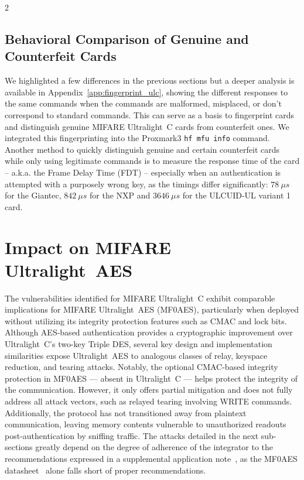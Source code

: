 \documentclass[10pt,letterpaper]{article}
\begin{document}
\begin{multicols}{2}
\subsection{Behavioral Comparison of Genuine and Counterfeit Cards}
\label{sec:fingerprint_ulc}
We highlighted a few differences in the previous sections but a deeper analysis is available in Appendix~\ref{app:fingerprint_ulc}, showing the different responses to the same commands when the commands are malformed, misplaced, or don't correspond to standard commands.
This can serve as a basis to fingerprint cards and distinguish genuine MIFARE Ultralight~C cards from counterfeit ones. We integrated this fingerprinting into the Proxmark3 \texttt{hf mfu info} command.
Another method to quickly distinguish genuine and certain counterfeit cards while only using legitimate commands is to measure the response time of the card -- a.k.a. the Frame Delay Time (FDT) -- especially when an authentication is attempted with a purposely wrong key, as the timings differ significantly: $78~{\mu}s$ for the Giantec, $842~{\mu}s$ for the NXP and $3646~{\mu}s$ for the ULCUID-UL variant 1 card.

\section{Impact on MIFARE Ultralight~AES}
\label{sec:ulaes}
The vulnerabilities identified for MIFARE Ultralight~C exhibit comparable implications for MIFARE Ultralight~AES (MF0AES), particularly when deployed without utilizing its integrity protection features such as CMAC and lock bits. Although AES-based authentication provides a cryptographic improvement over Ultralight~C's two-key Triple DES, several key design and implementation similarities expose Ultralight~AES to analogous classes of relay, keyspace reduction, and tearing attacks. Notably, the optional CMAC-based integrity protection in MF0AES --- absent in Ultralight~C --- helps protect the integrity of the communication. However, it only offers partial mitigation and does not fully address all attack vectors, such as relayed tearing involving WRITE commands. Additionally, the protocol has not transitioned away from plaintext communication, leaving memory contents vulnerable to unauthorized readouts post-authentication by sniffing traffic.
The attacks detailed in the next sub-sections greatly depend on the degree of adherence of the integrator to the recommendations expressed in a supplemental application note~\cite{nxp_an13452}, as the MF0AES datasheet~\cite{mf0aes_3r2_2023} alone falls short of proper recommendations.


\end{multicols}
\end{document}
